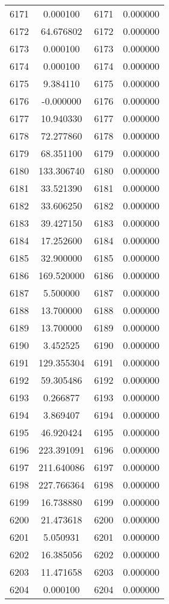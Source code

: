 \documentclass[12pt]{article}
\begin{document}
\begin{longtable}{@{}cccc@{}}
6171 & 0.000100 & 6171 & 0.000000 \\
6172 & 64.676802 & 6172 & 0.000000 \\
6173 & 0.000100 & 6173 & 0.000000 \\
6174 & 0.000100 & 6174 & 0.000000 \\
6175 & 9.384110 & 6175 & 0.000000 \\
6176 & -0.000000 & 6176 & 0.000000 \\
6177 & 10.940330 & 6177 & 0.000000 \\
6178 & 72.277860 & 6178 & 0.000000 \\
6179 & 68.351100 & 6179 & 0.000000 \\
6180 & 133.306740 & 6180 & 0.000000 \\
6181 & 33.521390 & 6181 & 0.000000 \\
6182 & 33.606250 & 6182 & 0.000000 \\
6183 & 39.427150 & 6183 & 0.000000 \\
6184 & 17.252600 & 6184 & 0.000000 \\
6185 & 32.900000 & 6185 & 0.000000 \\
6186 & 169.520000 & 6186 & 0.000000 \\
6187 & 5.500000 & 6187 & 0.000000 \\
6188 & 13.700000 & 6188 & 0.000000 \\
6189 & 13.700000 & 6189 & 0.000000 \\
6190 & 3.452525 & 6190 & 0.000000 \\
6191 & 129.355304 & 6191 & 0.000000 \\
6192 & 59.305486 & 6192 & 0.000000 \\
6193 & 0.266877 & 6193 & 0.000000 \\
6194 & 3.869407 & 6194 & 0.000000 \\
6195 & 46.920424 & 6195 & 0.000000 \\
6196 & 223.391091 & 6196 & 0.000000 \\
6197 & 211.640086 & 6197 & 0.000000 \\
6198 & 227.766364 & 6198 & 0.000000 \\
6199 & 16.738880 & 6199 & 0.000000 \\
6200 & 21.473618 & 6200 & 0.000000 \\
6201 & 5.050931 & 6201 & 0.000000 \\
6202 & 16.385056 & 6202 & 0.000000 \\
6203 & 11.471658 & 6203 & 0.000000 \\
6204 & 0.000100 & 6204 & 0.000000 \\

\end{longtable}
\end{document}
